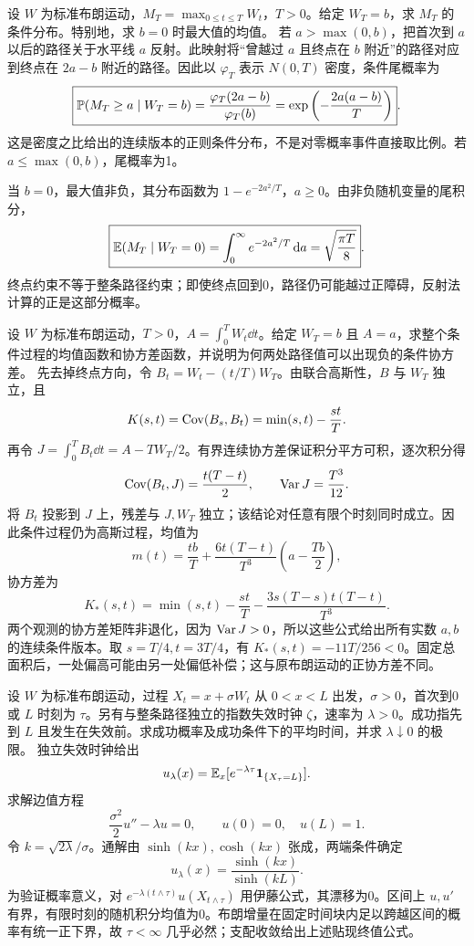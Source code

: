 设 $W$ 为标准布朗运动，$M_T=\max_{0\le t\le T}W_t$，$T>0$。给定 $W_T=b$，求 $M_T$ 的条件分布。特别地，求 $b=0$ 时最大值的均值。
\solution 若 $a>\max(0,b)$，把首次到 $a$ 以后的路径关于水平线 $a$ 反射。此映射将“曾越过 $a$ 且终点在 $b$ 附近”的路径对应到终点在 $2a-b$ 附近的路径。因此以 $\varphi_T$ 表示 $N(0,T)$ 密度，条件尾概率为
\[
 \boxed{\mathbb{P}(M_T\ge a\mid W_T=b)
 =\frac{\varphi_T(2a-b)}{\varphi_T(b)}
 =\exp\left(-\frac{2a(a-b)}T\right)}.
\]
这是密度之比给出的连续版本的正则条件分布，不是对零概率事件直接取比例。若 $a\le\max(0,b)$，尾概率为1。

当 $b=0$，最大值非负，其分布函数为 $1-e^{-2a^2/T}$，$a\ge0$。由非负随机变量的尾积分，
\[
 \boxed{\mathbb{E}(M_T\mid W_T=0)=\int_0^\infty e^{-2a^2/T}\,\mathrm{d} a
 =\sqrt{\frac{\pi T}{8}}}.
\]
\insight 终点约束不等于整条路径约束；即使终点回到0，路径仍可能越过正障碍，反射法计算的正是这部分概率。

设 $W$ 为标准布朗运动，$T>0$，$A=\int_0^T W_t\dd t$。给定 $W_T=b$ 且 $A=a$，求整个条件过程的均值函数和协方差函数，并说明为何两处路径值可以出现负的条件协方差。
\solution 先去掉终点方向，令 $B_t=W_t-(t/T)W_T$。由联合高斯性，$B$ 与 $W_T$ 独立，且
\[
 K(s,t)=\operatorname{Cov}(B_s,B_t)=\min(s,t)-\frac{st}{T}.
\]
再令 $J=\int_0^T B_t\dd t=A-TW_T/2$。有界连续协方差保证积分平方可积，逐次积分得
\[
 \operatorname{Cov}(B_t,J)=\frac{t(T-t)}2,\qquad \operatorname{Var} J=\frac{T^3}{12}.
\]
将 $B_t$ 投影到 $J$ 上，残差与 $J,W_T$ 独立；该结论对任意有限个时刻同时成立。因此条件过程仍为高斯过程，均值为
\[
 \boxed{m(t)=\frac{tb}{T}
 +\frac{6t(T-t)}{T^3}\left(a-\frac{Tb}{2}\right)},
\]
协方差为
\[
 \boxed{K_*(s,t)=\min(s,t)-\frac{st}{T}
 -\frac{3s(T-s)t(T-t)}{T^3}}.
\]
两个观测的协方差矩阵非退化，因为 $\operatorname{Var} J>0$，所以这些公式给出所有实数 $a,b$ 的连续条件版本。取 $s=T/4,t=3T/4$，有 $K_*(s,t)=-11T/256<0$。固定总面积后，一处偏高可能由另一处偏低补偿；这与原布朗运动的正协方差不同。

设 $W$ 为标准布朗运动，过程 $X_t=x+\sigma W_t$ 从 $0<x<L$ 出发，$\sigma>0$，首次到0或 $L$ 时刻为 $\tau$。另有与整条路径独立的指数失效时钟 $\zeta$，速率为 $\lambda>0$。成功指先到 $L$ 且发生在失效前。求成功概率及成功条件下的平均时间，并求 $\lambda\downarrow0$ 的极限。
\solution 独立失效时钟给出
\[
 u_\lambda(x)=\mathbb{E}_x[e^{-\lambda\tau}\mathbf{1}_{\{X_\tau=L\}}].
\]
求解边值方程
\[
 \frac{\sigma^2}{2}u''-\lambda u=0,\qquad u(0)=0,\quad u(L)=1.
\]
令 $k=\sqrt{2\lambda}/\sigma$。通解由 $\sinh(kx),\cosh(kx)$ 张成，两端条件确定
\[
 \boxed{u_\lambda(x)=\frac{\sinh(kx)}{\sinh(kL)}}.
\]
为验证概率意义，对 $e^{-\lambda(t\wedge\tau)}u(X_{t\wedge\tau})$ 用伊藤公式，其漂移为0。区间上 $u,u'$ 有界，有限时刻的随机积分均值为0。布朗增量在固定时间块内足以跨越区间的概率有统一正下界，故 $\tau<\infty$ 几乎必然；支配收敛给出上述贴现终值公式。

